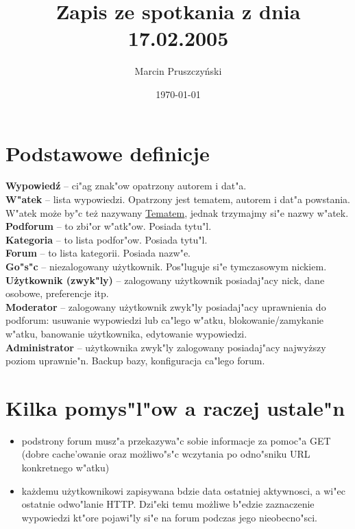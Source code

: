 \documentclass[12pt,a4paper,twoside]{article}
\author{Marcin Pruszczy\'nski}
\title{Zapis ze spotkania z dnia 17.02.2005}
\date{\today}
\begin{document}
\maketitle

\section{Podstawowe definicje}
\textbf{Wypowied\'z} -- ci"ag znak"ow opatrzony autorem i dat"a. \\
\textbf{W"atek} -- lista wypowiedzi. Opatrzony jest tematem, autorem i dat"a powstania. W"atek mo\.ze by"c te\.z nazywany \underline{Tematem}, jednak trzymajmy si"e nazwy w"atek. \\
\textbf{Podforum} -- to zbi"or w"atk"ow. Posiada tytu"l.\\
\textbf{Kategoria} -- to lista podfor"ow. Posiada tytu"l.\\
\textbf{Forum} -- to lista kategorii. Posiada nazw"e.\\
\textbf{Go"s"c} -- niezalogowany u\.zytkownik. Pos"luguje si"e tymczasowym nickiem.\\
\textbf{U\.zytkownik (zwyk"ly)} -- zalogowany u\.zytkownik posiadaj"acy nick, dane osobowe, preferencje itp.\\
\textbf{Moderator} -- zalogowany u\.zytkownik zwyk"ly posiadaj"acy uprawnienia do podforum: usuwanie wypowiedzi lub ca"lego w"atku, blokowanie/zamykanie w"atku, banowanie u\.zytkownika, edytowanie wypowiedzi.\\
\textbf{Administrator} -- u\.zytkownika zwyk"ly zalogowany posiadaj"acy najwy\.zszy poziom uprawnie"n. Backup bazy, konfiguracja ca"lego forum.\\

\section{Kilka pomys"l"ow a raczej ustale"n}
\begin{itemize}
\item podstrony forum musz"a przekazywa"c sobie informacje za pomoc"a GET (dobre cache'owanie oraz mo\.zliwo"s"c wczytania po odno"sniku URL konkretnego w"atku)
\item ka\.zdemu u\.zytkownikowi zapisywana bdzie data ostatniej aktywnosci, a wi"ec ostatnie odwo"lanie HTTP. Dzi"eki temu mo\.zliwe b"edzie zaznaczenie wypowiedzi kt"ore pojawi"ly si"e na forum podczas jego nieobecno"sci.
\end{itemize}
\end{document}
